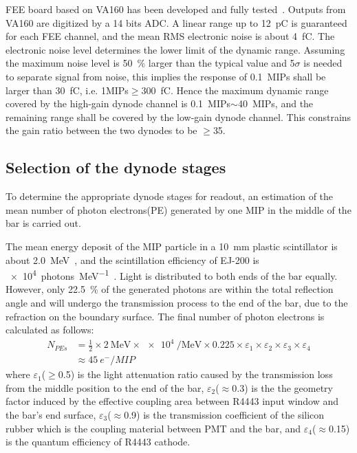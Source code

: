 \documentclass[5p, times]{elsarticle}
\begin{document}
FEE board based on VA160 has been developed and fully tested~\cite{fee}. Outputs from VA160 are digitized by a 14 bits ADC.
A linear range up to \SI{12}{\pico\coulomb} is guaranteed for each FEE channel, and the mean RMS electronic noise is about \SI{4}{\femto\coulomb}. 
The electronic noise level determines the lower limit of the dynamic range.
Assuming the maximum noise level is \SI{50}{\percent} larger than the typical value and 5$\sigma$ is needed to separate signal from noise, this implies the response of \SI{0.1}{MIPs} shall be larger than \SI{30}{\femto\coulomb}, i.e. 1MIPs$\geq$\SI{300}{\femto\coulomb}.
Hence the maximum dynamic range covered by the high-gain dynode channel is \SI{0.1}{MIPs}$\sim$\SI{40}{MIPs}, and the remaining range shall be covered by the low-gain dynode channel.
This constrains the gain ratio between the two dynodes to be $\geq$35.

\subsection{Selection of the dynode stages}
\label{sec:dynodes_selection}
To determine the appropriate dynode stages for readout, an estimation of the mean number of photon electrons(PE) generated by one MIP in the middle of the bar is carried out.

The mean energy deposit of the MIP particle in a \SI{10}{\milli\meter} plastic scintillator is about \SI{2.0}{\mega\electronvolt}~\cite{olive_review_2014}, and the scintillation efficiency of EJ-200 is \SI[per-mode=symbol]{e4}{photons\per\mega\electronvolt}~\cite{scintillator}.
Light is distributed to both ends of the bar equally.
However, only \SI{22.5}{\percent} of the generated photons are within the total reflection angle and will undergo the transmission process to the end of the bar, due to the refraction on the boundary surface.
The final number of photon electrons is calculated as follows:
\begin{align}
 N_{PEs} &= \frac{1}{2} \times \SI[per-mode=symbol]{2}{\mega\electronvolt} \times \SI{e4}{\per\mega\electronvolt} \times 0.225
           \times \varepsilon_{1} \times \varepsilon_{2} \times \varepsilon_{3} \times \varepsilon_{4} \nonumber \\
         &\approx \SI{45}{e^-\per{MIP}}
\label{eq:pes}
\end{align} 
where $\varepsilon_1$($\geq$0.5) is the light attenuation ratio caused by the transmission loss from the middle position to the end of the bar,
$\varepsilon_2$($\approx$0.3) is the the geometry factor induced by the effective coupling area between R4443 input window and the bar's end surface,
$\varepsilon_3$($\approx$0.9) is the transmission coefficient of the silicon rubber which is the coupling material between PMT and the bar,
and $\varepsilon_4$($\approx$0.15) is the quantum efficiency of R4443 cathode.
\end{document}

